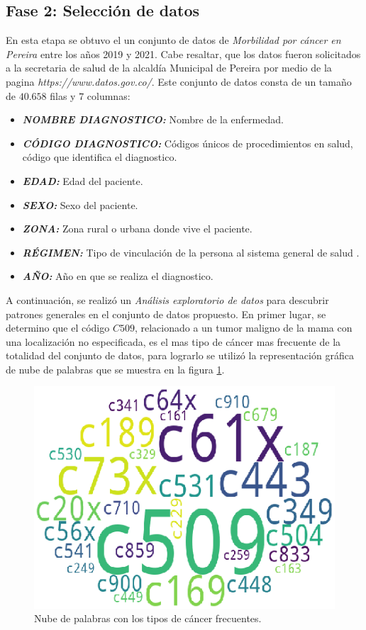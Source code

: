 \newpage
\subsection{Fase 2: Selección de datos}
En esta etapa se obtuvo el un conjunto de datos de \textit{Morbilidad por cáncer en Pereira} entre los años 2019 y 2021. Cabe resaltar, que los datos fueron solicitados a la secretaria de salud de la alcaldía Municipal de Pereira por medio de la pagina \textit{https://www.datos.gov.co/}. Este conjunto de datos consta de un tamaño de $40.658$ filas y $7$ columnas: 
\begin{itemize}[label=\SquareShadowTopLeft]
	\item  \textit{\textbf{NOMBRE DIAGNOSTICO:}} 	
	Nombre de la enfermedad.
	\item  \textit{\textbf{CÓDIGO DIAGNOSTICO:}} 	
	Códigos únicos de procedimientos en salud, código que identifica el diagnostico.
	\item  \textit{\textbf{EDAD:}} 	
	Edad del paciente.
	\item  \textit{\textbf{SEXO:}} 	
	Sexo del paciente.
	\item  \textit{\textbf{ZONA:}} 	
	Zona rural o urbana donde vive el paciente.
	\item  \textit{\textbf{RÉGIMEN:}} 	
	Tipo de vinculación de la persona al sistema general de salud .
	\item  \textit{\textbf{AÑO:}} 	
	Año en que se realiza el diagnostico.
\end{itemize}

A continuación, se realizó un \textit{Análisis exploratorio de datos} para descubrir patrones generales en el conjunto de datos propuesto. En primer lugar, se determino que el código $C509$, relacionado a un tumor maligno de la mama con una localización no especificada, es el mas tipo de cáncer mas frecuente de la totalidad del conjunto de datos, para lograrlo se utilizó la representación gráfica de nube de palabras que se muestra en la figura \ref{WORD_CLOUD}.

\begin{figure}[h!]
	\centering
	\includegraphics[width=0.84
	\linewidth]{IMAGENES/WORD_CLOUD}
	\caption{Nube de palabras con los tipos de cáncer frecuentes.}
	\label{WORD_CLOUD}
\end{figure}

